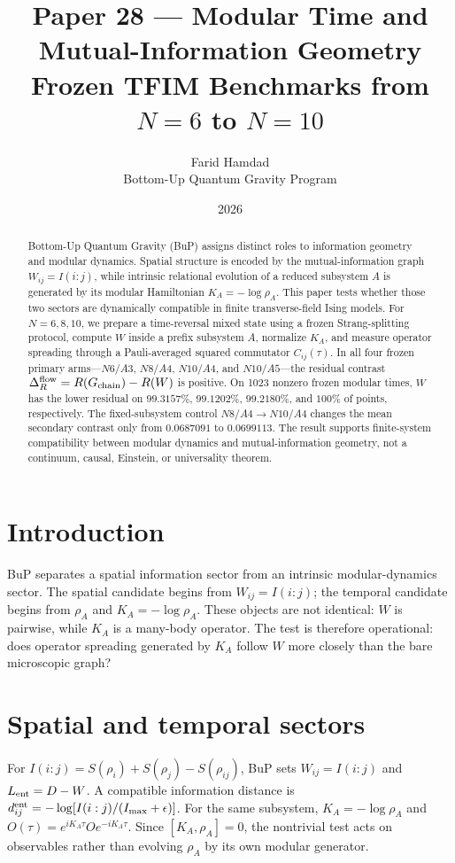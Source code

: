 \documentclass[11pt,a4paper]{article}
\title{\textbf{Paper 28 --- Modular Time and Mutual-Information Geometry}\\[0.35em]\large Frozen TFIM Benchmarks from $N=6$ to $N=10$}
\author{Farid Hamdad\\\small Bottom-Up Quantum Gravity Program}\date{2026}
\begin{document}
\maketitle
\begin{abstract}
Bottom-Up Quantum Gravity (BuP) assigns distinct roles to information geometry and modular dynamics. Spatial structure is encoded by the mutual-information graph $W_{ij}=I(i:j)$, while intrinsic relational evolution of a reduced subsystem $A$ is generated by its modular Hamiltonian $K_A=-\log\rho_A$. This paper tests whether those two sectors are dynamically compatible in finite transverse-field Ising models. For $N=6,8,10$, we prepare a time-reversal mixed state using a frozen Strang-splitting protocol, compute $W$ inside a prefix subsystem $A$, normalize $K_A$, and measure operator spreading through a Pauli-averaged squared commutator $C_{ij}(\tau)$. In all four frozen primary arms---$N6/A3$, $N8/A4$, $N10/A4$, and $N10/A5$---the residual contrast $\Delta_R^{\rm flow}=R(G_{\rm chain})-R(W)$ is positive. On 1023 nonzero frozen modular times, $W$ has the lower residual on $99.3157\%$, $99.1202\%$, $99.2180\%$, and $100\%$ of points, respectively. The fixed-subsystem control $N8/A4\to N10/A4$ changes the mean secondary contrast only from $0.0687091$ to $0.0699113$. The result supports finite-system compatibility between modular dynamics and mutual-information geometry, not a continuum, causal, Einstein, or universality theorem.
\end{abstract}
\tableofcontents
\section{Introduction}
BuP separates a spatial information sector from an intrinsic modular-dynamics sector. The spatial candidate begins from $W_{ij}=I(i:j)$; the temporal candidate begins from $\rho_A$ and $K_A=-\log\rho_A$. These objects are not identical: $W$ is pairwise, while $K_A$ is a many-body operator. The test is therefore operational: does operator spreading generated by $K_A$ follow $W$ more closely than the bare microscopic graph?
\section{Spatial and temporal sectors}
For $I(i:j)=S(\rho_i)+S(\rho_j)-S(\rho_{ij})$, BuP sets $W_{ij}=I(i:j)$ and $L_{\rm ent}=D-W$. A compatible information distance is $d_{ij}^{\rm ent}=-\log[I(i:j)/(I_{\max}+\epsilon)]$. For the same subsystem, $K_A=-\log\rho_A$ and $O(\tau)=e^{iK_A\tau}Oe^{-iK_A\tau}$. Since $[K_A,\rho_A]=0$, the nontrivial test acts on observables rather than evolving $\rho_A$ by its own modular generator.
\end{document}
